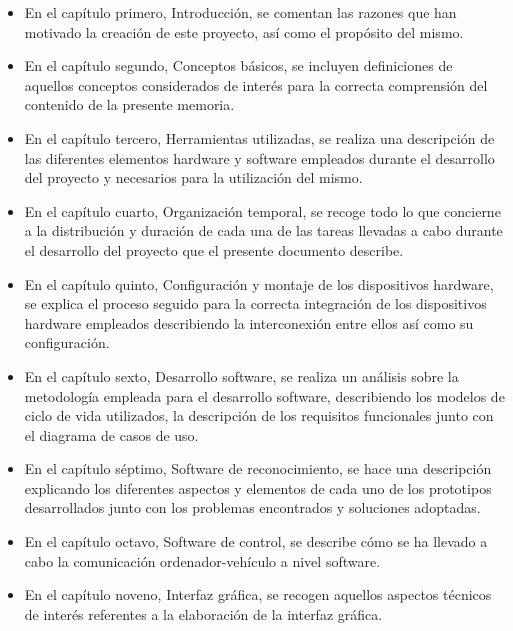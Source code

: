 \documentclass[a4paper,12pt]{article}
\begin{document}
\begin{itemize}

\item En el capítulo primero, Introducción, se comentan las razones que han motivado la creación de este proyecto, así como el propósito del mismo.

\item En el capítulo segundo, Conceptos básicos, se incluyen definiciones de aquellos conceptos considerados de interés para la correcta comprensión del contenido de la presente memoria.

\item En el capítulo tercero, Herramientas utilizadas, se realiza una descripción de las diferentes elementos hardware y software empleados durante el desarrollo del proyecto y necesarios para la utilización del mismo.

\item En el capítulo cuarto, Organización temporal, se recoge todo lo que concierne a la distribución y duración de cada una de las tareas llevadas a cabo durante el desarrollo del proyecto que el presente documento describe.

\item En el capítulo quinto, Configuración y montaje de los dispositivos hardware, se explica el proceso seguido para la correcta integración de los dispositivos hardware empleados describiendo la interconexión entre ellos así como su configuración. 

\item En el capítulo sexto, Desarrollo software, se realiza un análisis sobre la metodología empleada para el desarrollo software, describiendo los modelos de ciclo de vida utilizados, la descripción de los requisitos funcionales junto con el diagrama de casos de uso.

\item En el capítulo séptimo, Software de reconocimiento, se hace una descripción explicando los diferentes aspectos y elementos de cada uno de los prototipos desarrollados junto con los problemas encontrados y soluciones adoptadas.

\item En el capítulo octavo, Software de control, se describe cómo se ha llevado a cabo la comunicación ordenador-vehículo a nivel software.

\item En el capítulo noveno, Interfaz gráfica, se recogen aquellos aspectos técnicos de interés referentes a la elaboración de la interfaz gráfica.


\end{itemize}
\end{document}
